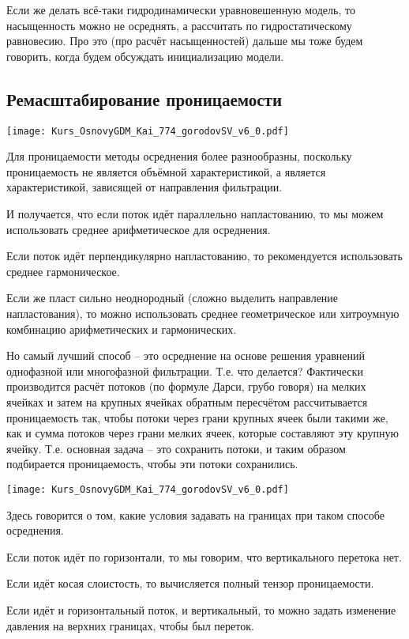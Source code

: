 \documentclass[main.tex]{subfiles}
\begin{document}
Если же делать всё-таки гидродинамически уравновешенную модель, то насыщенность можно не осреднять, а рассчитать по гидростатическому равновесию.
Про это (про расчёт насыщенностей) дальше мы тоже будем говорить, когда будем обсуждать инициализацию модели.

\subsection{Ремасштабирование проницаемости}

\texttt{[image: Kurs\_OsnovyGDM\_Kai\_774\_gorodovSV\_v6\_0.pdf]}

Для проницаемости методы осреднения более разнообразны, поскольку проницаемость не является объёмной характеристикой, а является характеристикой, зависящей от направления фильтрации.

И получается, что если поток идёт параллельно напластованию, то мы можем использовать среднее арифметическое для осреднения.

Если поток идёт перпендикулярно напластованию, то рекомендуется использовать среднее гармоническое.

Если же пласт сильно неоднородный (сложно выделить направление напластования), то можно использовать среднее геометрическое или хитроумную комбинацию арифметических и гармонических.

Но самый лучший способ -- это осреднение на основе решения уравнений однофазной или многофазной фильтрации.
Т.е. что делается?
Фактически производится расчёт потоков (по формуле Дарси, грубо говоря) на мелких ячейках и затем на крупных ячейках обратным пересчётом рассчитывается проницаемость так, чтобы потоки через грани крупных ячеек были такими же, как и сумма потоков через грани мелких ячеек, которые составляют эту крупную ячейку. Т.е. основная задача -- это сохранить потоки, и таким образом подбирается проницаемость, чтобы эти потоки сохранились.

\texttt{[image: Kurs\_OsnovyGDM\_Kai\_774\_gorodovSV\_v6\_0.pdf]}

Здесь говорится о том, какие условия задавать на границах при таком способе осреднения.

Если поток идёт по горизонтали, то мы говорим, что вертикального перетока нет.

Если идёт косая слоистость, то вычисляется полный тензор проницаемости.

Если идёт и горизонтальный поток, и вертикальный, то можно задать изменение давления на верхних границах, чтобы был переток.
\end{document}
